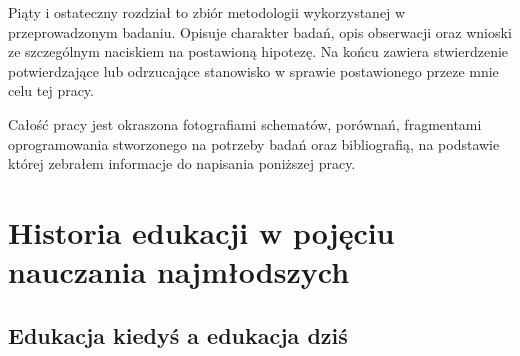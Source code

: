 \documentclass{article}
\begin{document}
\par
Piąty i ostateczny rozdział to zbiór metodologii wykorzystanej w przeprowadzonym badaniu. Opisuje charakter badań, opis obserwacji oraz wnioski ze szczególnym naciskiem na postawioną hipotezę. Na końcu zawiera stwierdzenie potwierdzające lub odrzucające stanowisko w sprawie postawionego przeze mnie celu tej pracy.
\par
Całość pracy jest okraszona fotografiami schematów, porównań, fragmentami oprogramowania stworzonego na potrzeby badań oraz bibliografią, na podstawie której zebrałem informacje do napisania poniższej pracy.

\section{Historia edukacji w pojęciu nauczania najmłodszych}
\subsection{Edukacja kiedyś a edukacja dziś}
\end{document}
